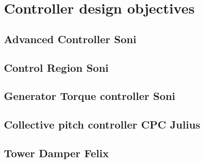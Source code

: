 \chapter{Controller design objectives}
\section{Advanced Controller Soni}

\section{Control Region Soni}

\section{Generator Torque controller Soni}

\section{Collective pitch controller CPC Julius}

\section{Tower Damper Felix}